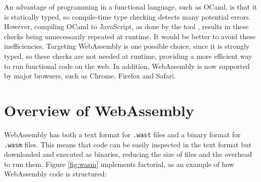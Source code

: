 

An advantage of programming in a functional language, such as OCaml, is that it is statically typed, so compile-time type checking detects many potential errors. However, compiling OCaml to JavaScript, as done by the \jsofocaml{} tool \cite{jsofocaml}, results in these checks being unnecessarily repeated at runtime. It would be better to avoid these inefficiencies.
Targeting WebAssembly is one possible choice, since it is strongly typed, so these checks are not needed at runtime, providing a more efficient way to run functional code on the web. In addition, WebAssembly is now supported by major browsers, such as Chrome, Firefox and Safari.



\section{Overview of WebAssembly}
WebAssembly has both a text format for \verb|.wast| files and a binary format for \verb|.wasm| files. This means that code can be easily inspected in the text format but downloaded and executed as binaries, reducing the size of files and the overhead to run them. Figure \ref{fig:wasm} implements factorial, as an example of how WebAssembly code is structured:

